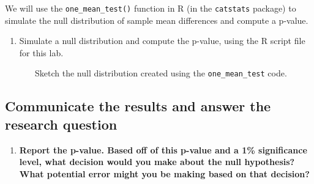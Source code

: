 \documentclass[
]{report}
\newenvironment{Shaded}{\begin{snugshade}}{\end{snugshade}}
\newcommand{\AttributeTok}[1]{\textcolor[rgb]{0.13,0.29,0.53}{#1}}
\newcommand{\CommentTok}[1]{\textcolor[rgb]{0.56,0.35,0.01}{\textit{#1}}}
\newcommand{\DecValTok}[1]{\textcolor[rgb]{0.00,0.00,0.81}{#1}}
\newcommand{\FloatTok}[1]{\textcolor[rgb]{0.00,0.00,0.81}{#1}}
\newcommand{\FunctionTok}[1]{\textcolor[rgb]{0.13,0.29,0.53}{\textbf{#1}}}
\newcommand{\NormalTok}[1]{#1}
\newcommand{\SpecialCharTok}[1]{\textcolor[rgb]{0.81,0.36,0.00}{\textbf{#1}}}
\newcommand{\StringTok}[1]{\textcolor[rgb]{0.31,0.60,0.02}{#1}}
\providecommand{\tightlist}{%
  \setlength{\itemsep}{0pt}\setlength{\parskip}{0pt}}
\begin{document}
We will use the \texttt{one\_mean\_test()} function in R (in the \texttt{catstats} package) to simulate the null distribution of sample mean differences and compute a p-value.

\newpage

\begin{enumerate}
\def\labelenumi{\arabic{enumi}.}
\setcounter{enumi}{9}
\tightlist
\item
  Simulate a null distribution and compute the p-value, using the R script file for this lab.
\end{enumerate}

\begin{Shaded}
\end{Shaded}

~~~~~~~Sketch the null distribution created using the \texttt{one\_mean\_test} code.

\vspace{1.5in}

\subsection*{Communicate the results and answer the research question}\label{communicate-the-results-and-answer-the-research-question}

\begin{enumerate}
\def\labelenumi{\arabic{enumi}.}
\setcounter{enumi}{10}
\tightlist
\item
  \textbf{Report the p-value. Based off of this p-value and a 1\% significance level, what decision would you make about the null hypothesis? What potential error might you be making based on that decision?}
\end{enumerate}
\end{document}
